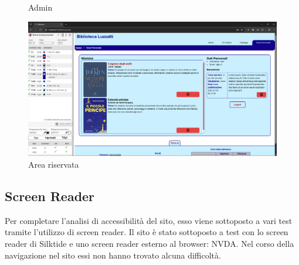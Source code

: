 \documentclass{article}
\begin{document}
\begin{figure}[H]
\begin{minipage}[t]{0.5\textwidth}
        \caption{Admin}
    \end{minipage}
    \hfill
    \begin{minipage}[t]{0.5\textwidth}
        \centering
        \includegraphics[width=\textwidth]{./img/area_riservata.png}
        \caption{Area riservata}
    \end{minipage}
\end{figure}


\subsection{Screen Reader}
Per completare l'analisi di accessibilità del sito, esso viene sottoposto a vari test tramite l'utilizzo di screen reader. Il sito è stato sottoposto a test con lo screen reader di Silktide e uno screen reader esterno al browser: NVDA. Nel corso della navigazione nel sito essi non hanno trovato alcuna difficoltà.
\end{document}
